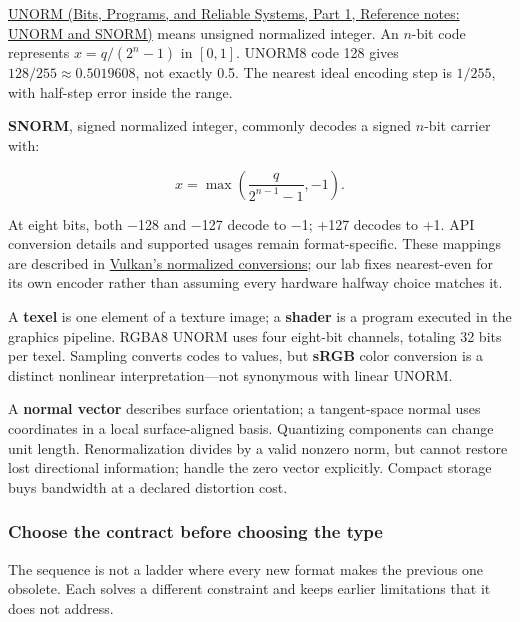\href{../01-Bits-Programs-and-Reliable-Systems-P01/main.pdf\#nameddest=appendix-b2402c453dac}{UNORM (Bits, Programs, and Reliable Systems, Part 1, Reference notes: UNORM and SNORM)} means unsigned normalized integer. An \(n\)-bit code represents \(x=q/(2^n-1)\) in \([0,1]\). UNORM8 code 128 gives \(128/255\approx0.5019608\), not exactly 0.5. The nearest ideal encoding step is \(1/255\), with half-step error inside the range.

\textbf{SNORM}, signed normalized integer, commonly decodes a signed \(n\)-bit carrier with:

\[
x=\max\!\left(\frac{q}{2^{n-1}-1},-1\right).
\]

At eight bits, both −128 and −127 decode to −1; +127 decodes to +1. API conversion details and supported usages remain format-specific. These mappings are described in \href{https://docs.vulkan.org/spec/latest/chapters/fundamentals.html\#fundamentals-fixedfpconv}{Vulkan's normalized conversions}; our lab fixes nearest-even for its own encoder rather than assuming every hardware halfway choice matches it.

A \textbf{texel} is one element of a texture image; a \textbf{shader} is a program executed in the graphics pipeline. RGBA8 UNORM uses four eight-bit channels, totaling 32 bits per texel. Sampling converts codes to values, but \textbf{sRGB} color conversion is a distinct nonlinear interpretation---not synonymous with linear UNORM.

A \textbf{normal vector} describes surface orientation; a tangent-space normal uses coordinates in a local surface-aligned basis. Quantizing components can change unit length. Renormalization divides by a valid nonzero norm, but cannot restore lost directional information; handle the zero vector explicitly. Compact storage buys bandwidth at a declared distortion cost.

\subsubsection{Choose the contract before choosing the type}\label{05-engine-i-ch001-choose-the-contract-before-choosing-the-type}

\hypertarget{05-engine-i-ch001-choose-the-contract-before-choosing-the-type}{}

The sequence is not a ladder where every new format makes the previous one obsolete. Each solves a different constraint and keeps earlier limitations that it does not address.


